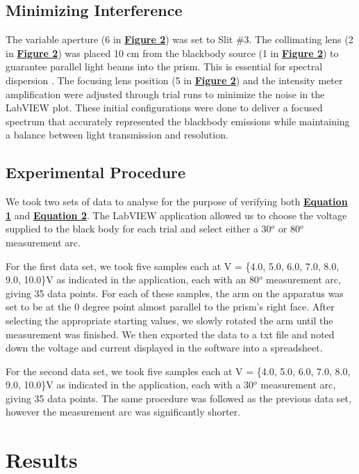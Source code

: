 \documentclass[
	letterpaper
	12pt
]{template}
\newcommand{\bref}[2]{\textbf{\hyperref[#1]{#2}}}
\begin{document}
\subsection{Minimizing Interference}
The variable aperture (6 in \bref{fig::apparatus}{Figure 2}) was set to Slit \#3. The collimating lens (2 in \bref{fig::apparatus}{Figure 2}) was placed  10 cm from the blackbody source (1 in \bref{fig::apparatus}{Figure 2}) to guarantee parallel light beams into the prism. This is essential for spectral dispersion \cite{labManual}. The  focusing lens position (5 in \bref{fig::apparatus}{Figure 2}) and the intensity meter amplification were adjusted through trial runs to minimize the noise in the LabVIEW plot. These initial configurations were done to deliver a focused spectrum that accurately represented the blackbody emissions while maintaining a balance between light transmission and resolution.
\subsection{Experimental Procedure}
We took two sets of data to analyse for the purpose of verifying both \bref{eqn::wien}{Equation 1} and \bref{eqn::stefan}{Equation 2}. The LabVIEW application allowed us to choose the voltage supplied to the black body for each trial and select either a $30\unit{^o}$ or $80\unit{^o}$ measurement arc. \vspace{\baselineskip}

For the first data set, we took five samples each at V = \{4.0, 5.0, 6.0, 7.0, 8.0, 9.0, 10.0\}{V} as indicated in the application, each with an $80\unit{^o}$ measurement arc, giving 35 data points. For each of these samples, the arm on the apparatus was set to be at the $0$ degree point almost parallel to the prism's right face. After selecting the appropriate starting values, we slowly rotated the arm until the measurement was finished. We then exported the data to a txt file and noted down the voltage and current displayed in the software into a spreadsheet.\vspace{\baselineskip}

For the second data set, we took five samples each at V = \{4.0, 5.0, 6.0, 7.0, 8.0, 9.0, 10.0\}{V} as indicated in the application, each with a $30\unit{^o}$ measurement arc, giving 35 data points. The same procedure was followed as the previous data set, however the measurement arc was significantly shorter.
\section{Results}
\end{document}
